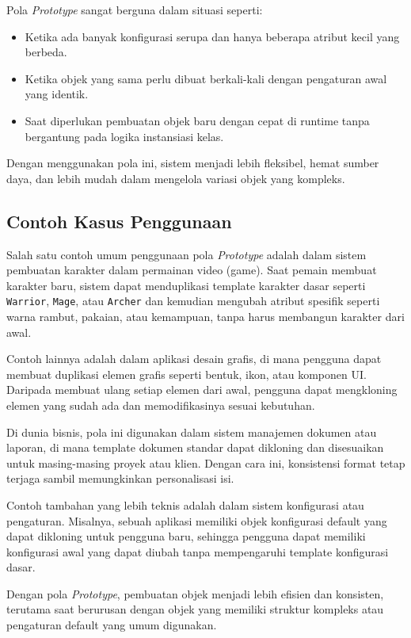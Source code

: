 Pola \textit{Prototype} sangat berguna dalam situasi seperti:
\begin{itemize}
\item Ketika ada banyak konfigurasi serupa dan hanya beberapa atribut kecil yang berbeda.
\item Ketika objek yang sama perlu dibuat berkali-kali dengan pengaturan awal yang identik.
\item Saat diperlukan pembuatan objek baru dengan cepat di runtime tanpa bergantung pada logika instansiasi kelas.
\end{itemize}

Dengan menggunakan pola ini, sistem menjadi lebih fleksibel, hemat sumber daya, dan lebih mudah dalam mengelola variasi objek yang kompleks.


\subsection{Contoh Kasus Penggunaan}

Salah satu contoh umum penggunaan pola \textit{Prototype} adalah dalam sistem pembuatan karakter dalam permainan video (game). Saat pemain membuat karakter baru, sistem dapat menduplikasi template karakter dasar seperti \texttt{Warrior}, \texttt{Mage}, atau \texttt{Archer} dan kemudian mengubah atribut spesifik seperti warna rambut, pakaian, atau kemampuan, tanpa harus membangun karakter dari awal.

Contoh lainnya adalah dalam aplikasi desain grafis, di mana pengguna dapat membuat duplikasi elemen grafis seperti bentuk, ikon, atau komponen UI. Daripada membuat ulang setiap elemen dari awal, pengguna dapat mengkloning elemen yang sudah ada dan memodifikasinya sesuai kebutuhan.

Di dunia bisnis, pola ini digunakan dalam sistem manajemen dokumen atau laporan, di mana template dokumen standar dapat dikloning dan disesuaikan untuk masing-masing proyek atau klien. Dengan cara ini, konsistensi format tetap terjaga sambil memungkinkan personalisasi isi.

Contoh tambahan yang lebih teknis adalah dalam sistem konfigurasi atau pengaturan. Misalnya, sebuah aplikasi memiliki objek konfigurasi default yang dapat dikloning untuk pengguna baru, sehingga pengguna dapat memiliki konfigurasi awal yang dapat diubah tanpa mempengaruhi template konfigurasi dasar.

Dengan pola \textit{Prototype}, pembuatan objek menjadi lebih efisien dan konsisten, terutama saat berurusan dengan objek yang memiliki struktur kompleks atau pengaturan default yang umum digunakan.


